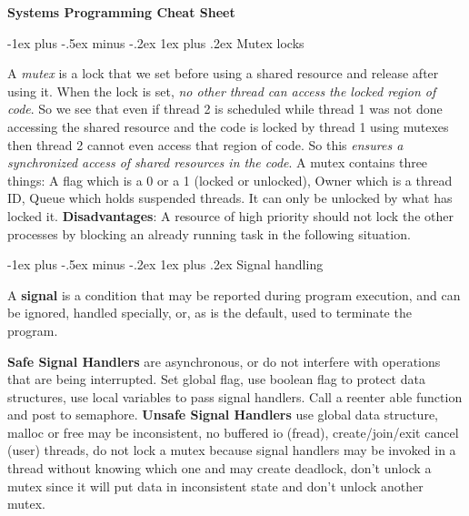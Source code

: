 \documentclass[10pt,landscape, a4paper]{article}
\makeatletter
\renewcommand{\subsection}{\@startsection{section}{1}{0mm}%
                                {-1ex plus -.5ex minus -.2ex}%
                                {0.5ex plus .2ex}%
                                {\normalfont\large\bfseries}}
\renewcommand{\subsection}{\@startsection{subsection}{2}{0mm}%
                                {-1explus -.5ex minus -.2ex}%
                                {0.5ex plus .2ex}%
                                {\normalfont\normalsize\bfseries}}
\renewcommand{\subsection}{\@startsection{subsubsection}{3}{0mm}%
                                {-1ex plus -.5ex minus -.2ex}%
                                {1ex plus .2ex}%
                                {\normalfont\small\bfseries}}
\makeatother
\begin{document}
\renewcommand{\ttdefault}{cmtt}

\raggedright
\footnotesize
\begin{multicols}{3}

\setlength{\premulticols}{1pt}
\setlength{\postmulticols}{1pt}
\setlength{\multicolsep}{1pt}
\setlength{\columnsep}{2pt}

\begin{center}
     \Large{\textbf{Systems Programming Cheat Sheet}} \\
\end{center}

\subsection{Mutex locks}

A \emph{mutex} is a lock that we set before using a shared resource and release after using it. 
When the lock is set, \emph{no other thread can access the locked region of code}. 
So we see that even if thread 2 is scheduled while thread 1 was not done accessing 
the shared resource and the code is locked by thread 1 using mutexes then thread 2 
cannot even access that region of code. So this \emph{ensures a synchronized access of shared resources in the code}.
A mutex contains three things: A flag which is a 0 or a 1 (locked or unlocked), 
Owner which is a thread ID, Queue which holds suspended threads. 
It can only be unlocked by what has locked it.
\textbf{Disadvantages}: A resource of high priority should not lock the other 
processes by blocking an already running task in the following situation.



\subsection{Signal handling}

A {\bf signal} is a condition that may be reported during program execution, 
and can be ignored, handled specially, or, as is the default, 
used to terminate the program.



\textbf{Safe Signal Handlers} are asynchronous, or do not interfere with operations 
that are being interrupted.
Set global flag, use boolean 
flag to protect data structures, use local variables to 
pass signal handlers.
Call a reenter able function and post to semaphore.
\textbf{Unsafe Signal Handlers} use global data structure, 
malloc or free may be inconsistent, no buffered io (fread), 
create/join/exit cancel (user) threads, do not lock a mutex 
because signal handlers may be invoked in a thread without 
knowing which one and may create deadlock, don't unlock a mutex 
since it will put data in inconsistent state and don't unlock another mutex.


\end{multicols}
\end{document}
